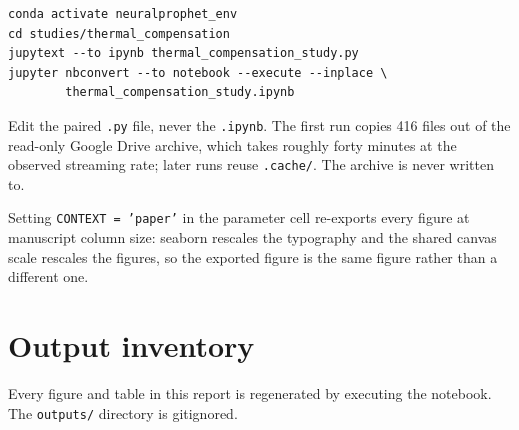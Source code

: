 \documentclass[11pt,a4paper]{article}
\begin{document}
\begin{verbatim}
conda activate neuralprophet_env
cd studies/thermal_compensation
jupytext --to ipynb thermal_compensation_study.py
jupyter nbconvert --to notebook --execute --inplace \
        thermal_compensation_study.ipynb
\end{verbatim}

\noindent Edit the paired \texttt{.py} file, never the \texttt{.ipynb}. The first run
copies 416 files out of the read-only Google Drive archive, which takes roughly forty
minutes at the observed streaming rate; later runs reuse \texttt{.cache/}. The archive
is never written to.

Setting \texttt{CONTEXT = 'paper'} in the parameter cell re-exports every figure at
manuscript column size: seaborn rescales the typography and the shared canvas scale
rescales the figures, so the exported figure is the same figure rather than a different
one.

\section{Output inventory}

Every figure and table in this report is regenerated by executing the notebook. The
\texttt{outputs/} directory is gitignored.
\end{document}
